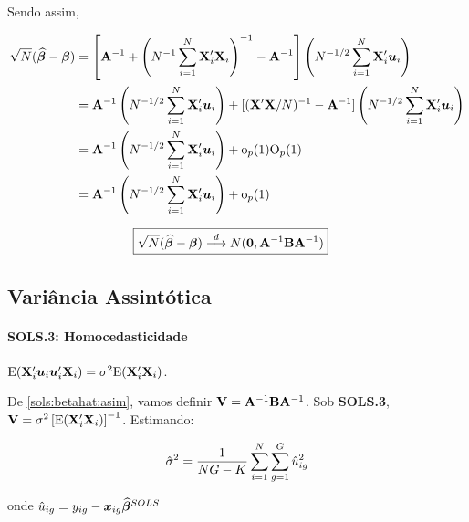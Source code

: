 \documentclass[11pt, oneside, a4paper, article]{article}
\numberwithin{equation}{section}
\begin{document}
\noindent
Sendo assim,

\vspace{-1 em}
\begin{align*} 
\sqrt{N}(\widehat{\boldsymbol{\beta}} - \boldsymbol{\beta}) &= 
\left[ 
\mathbf{A}^{-1} +
\left( N^{-1} \sum_{i=1}^{N} \mathbf{X}_{i}' \mathbf{X}_{i}   \right)^{-1}
- \mathbf{A}^{-1}
\right]
\left( N^{-1/2} \sum_{i=1}^{N} \mathbf{X}_{i}' \boldsymbol{u}_{i}   \right)
\\ &=
\mathbf{A}^{-1}\left( N^{-1/2} \sum_{i=1}^{N} \mathbf{X}_{i}' \boldsymbol{u}_{i}   \right)
+
[(\mathbf{X}'\mathbf{X}/N)^{-1} - \mathbf{A}^{-1}]
\left( N^{-1/2} \sum_{i=1}^{N} \mathbf{X}_{i}' \boldsymbol{u}_{i}   \right)
\\&=
\mathbf{A}^{-1}\left( N^{-1/2} \sum_{i=1}^{N} \mathbf{X}_{i}' \boldsymbol{u}_{i}   \right)
+ \text{o}_{p}(1) \text{O}_{p}(1)
\\&=
\mathbf{A}^{-1}\left( N^{-1/2} \sum_{i=1}^{N} \mathbf{X}_{i}' \boldsymbol{u}_{i}   \right)
+ \text{o}_{p}(1)
\end{align*}

\vspace{-1 em}
\begin{align}\label{sols:betahat:asim}
\Aboxed{
\sqrt{N}(\betahatbold - \betavec)
\arrowd
N(\mbs{0}, \Amat^{-1} \Bmat \Amat^{-1})
}
\end{align}

\subsection{Variância Assintótica}

\paragraph{SOLS.3: Homocedasticidade}
$\text{E}(\mathbf{X}_{i}' \boldsymbol{u}_{i} \boldsymbol{u}_{i}' \mathbf{X}_{i}) = \sigma^{2} \text{E}(\mathbf{X}_{i}' \mathbf{X}_{i})$.

\vspace{1 em} 
De \eqref{sols:betahat:asim}, vamos definir $\mathbf{V} = \mathbf{A}^{-1} \mathbf{B} \mathbf{A}^{-1}$.
Sob \textbf{SOLS.3},
$\mathbf{V} = \sigma^{2} \left[ \text{E}(\mathbf{X}_{i}' \mathbf{X}_{i}) \right]^{-1}$.
Estimando:

\vspace{-1 em}
\begin{align*}
\hat{\sigma}^{2}
=
\frac{1}{NG - K}
\sum_{i =1}^{N} \sum_{g=1}^{G} \hat{u}^2_{ig}
\end{align*}

\noindent onde $\hat{u}_{ig} = y_{ig} - \boldsymbol{x}_{ig} \widehat{\boldsymbol{\beta}}^{SOLS}$
\end{document}

